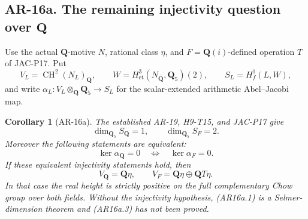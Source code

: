 \documentclass[11pt,a4paper]{article}
\newtheorem{corollary}[theorem]{Corollary}
\begin{document}
\subsection*{AR-16a. The remaining injectivity question over \(\mathbf Q\)}

Use the actual \(\mathbf Q\)-motive \(N\), rational class \(\eta\),
and \(F=\mathbf Q(i)\)-defined operation \(T\) of JAC-P17.
Put
\[
 V_L=\operatorname{CH}^2(N_L)_{\mathbf Q},\qquad
 W=H^3_{\mathrm{et}}(N_{\overline{\mathbf Q}},\mathbf Q_5)(2),
 \qquad
 S_L=H^1_f(L,W),
\]
and write \(\alpha_L:V_L\otimes_{\mathbf Q}\mathbf Q_5\to S_L\)
for the scalar-extended arithmetic Abel--Jacobi map.

\begin{corollary}[AR-16a]\label{ar16a}
The established AR-19, H9-T15, and JAC-P17 give
\[
                   \dim_{\mathbf Q_5}S_{\mathbf Q}=1,
       \qquad      \dim_{\mathbf Q_5}S_F=2.                \tag{AR16a.1}
\]
Moreover the following statements are equivalent:
\[
             \ker\alpha_{\mathbf Q}=0
                    \quad\Longleftrightarrow\quad
             \ker\alpha_F=0.                             \tag{AR16a.2}
\]
If these equivalent injectivity statements hold, then
\[
             V_{\mathbf Q}=\mathbf Q\eta,
       \qquad V_F=\mathbf Q\eta\oplus\mathbf Q T\eta.
                                                               \tag{AR16a.3}
\]
In that case the real height is strictly positive on the full
complementary Chow group over both fields. Without the
injectivity hypothesis, (AR16a.1) is a Selmer-dimension theorem
and (AR16a.3) has not been proved.
\end{corollary}
\end{document}
